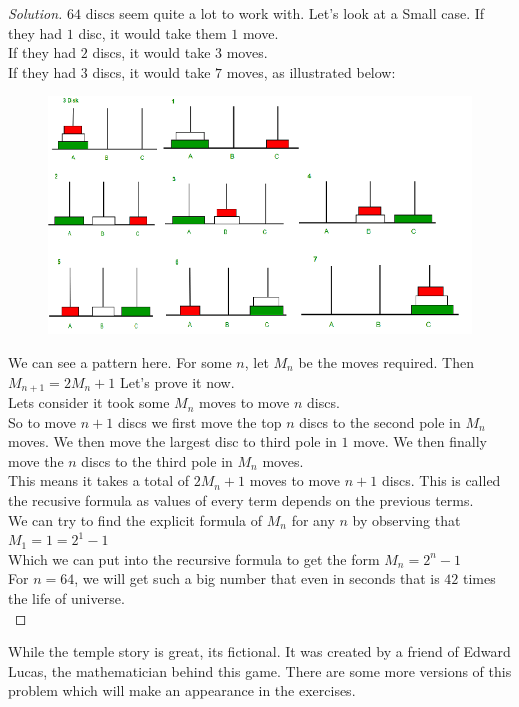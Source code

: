 \begin{proof}
    [Solution]
    $64$ discs seem quite a lot to work with. Let's look at a  Small case.
    If they had $1$ disc, it would take them $1$ move.\\
    If they had $2$ discs, it would take $3$ moves.\\
    If they had $3$ discs, it would take $7$ moves, as illustrated below:\\
    \begin{figure}[H]
        \centering
        \includegraphics[width=0.5\linewidth]{Tower of hanoi at n=3.png}
    \end{figure}
    We can see a pattern here. For some $n$, let $M_n$ be the moves required. Then $M_{n+1}=2M_{n}+1$ Let's prove it now.\\
    Lets consider it took some $M_n$ moves to move $n$ discs.\\
    So to move $n+1$ discs we first move the top $n$ discs to the second pole in $M_n$ moves. We then move the largest disc to third pole in $1$ move. We then finally move the $n$ discs to the third pole in $M_n$ moves.\\
    This means it takes a total of $2M_n+1$ moves to move $n+1$ discs. This is called the recusive formula as values of every term depends on the previous terms.\\
    We can try to find the explicit formula of $M_n$ for any $n$ by observing that $M_1=1=2^1-1$\\
    Which we can put into the recursive formula to get the form $M_n=2^n-1$\\
    For $n=64$, we will get such a big number that even in seconds that is $42$ times the life of universe.\\
\end{proof}
While the temple story is great, its fictional. It was created by a friend of Edward Lucas, the mathematician behind this game. There are some more versions of this problem which will make an appearance in the exercises.\\
